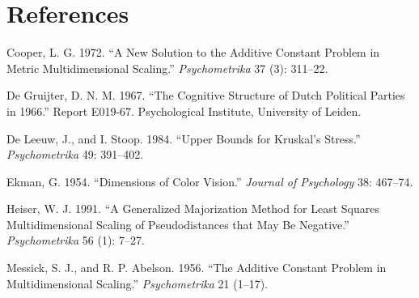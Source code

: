 \documentclass[
  12pt,
]{article}
\newlength{\cslhangindent}
\newenvironment{CSLReferences}[2] %
 {\begin{list}{}{%
  \setlength{\itemindent}{0pt}
  \setlength{\leftmargin}{0pt}
  \setlength{\parsep}{0pt}
  \ifodd #1
   \setlength{\leftmargin}{\cslhangindent}
   \setlength{\itemindent}{-1\cslhangindent}
  \fi
  \setlength{\itemsep}{#2\baselineskip}}}
 {\end{list}}
\begin{document}
\section*{References}\label{references}

\label{refs}
\begin{CSLReferences}{1}{0}
Cooper, L. G. 1972. {``{A New Solution to the Additive Constant Problem in Metric Multidimensional Scaling}.''} \emph{Psychometrika} 37 (3): 311--22.

De Gruijter, D. N. M. 1967. {``{The Cognitive Structure of Dutch Political Parties in 1966}.''} Report E019-67. Psychological Institute, University of Leiden.

De Leeuw, J., and I. Stoop. 1984. {``Upper Bounds for Kruskal's Stress.''} \emph{Psychometrika} 49: 391--402.

Ekman, G. 1954. {``{Dimensions of Color Vision}.''} \emph{Journal of Psychology} 38: 467--74.

Heiser, W. J. 1991. {``{A Generalized Majorization Method for Least Squares Multidimensional Scaling of Pseudodistances that May Be Negative}.''} \emph{Psychometrika} 56 (1): 7--27.

Messick, S. J., and R. P. Abelson. 1956. {``{The Additive Constant Problem in Multidimensional Scaling}.''} \emph{Psychometrika} 21 (1--17).

\end{CSLReferences}
\end{document}
